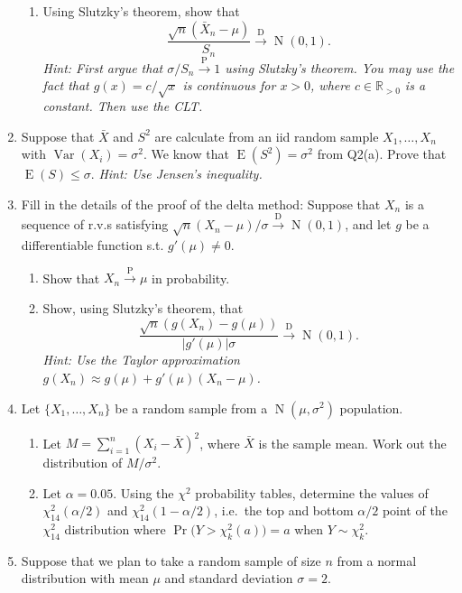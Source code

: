 \documentclass[
]{book}
\DeclareMathOperator{\E}{E}
\DeclareMathOperator{\Var}{Var}
\DeclareMathOperator{\N}{N}
\newcommand{\bbR}{\mathbb{R}}
\theoremstyle{definition}
\theoremstyle{definition}
\theoremstyle{definition}
\theoremstyle{definition}
\theoremstyle{remark}
\begin{document}
\begin{enumerate}
\begin{enumerate}
  \item
    Using Slutzky's theorem, show that
    \[
       \frac{\sqrt n(\bar X_n - \mu)}{S_n} \xrightarrow{\text{ D }} \N(0,1).
     \]
    \emph{Hint: First argue that \(\sigma/S_n \xrightarrow{\text{P}} 1\) using Slutzky's theorem. You may use the fact that \(g(x)=c/\sqrt{x}\) is continuous for \(x>0\), where \(c\in\bbR_{>0}\) is a constant. Then use the CLT.}
  \end{enumerate}
\item
  Suppose that \(\bar X\) and \(S^2\) are calculate from an iid random sample \(X_1,\dots,X_n\) with \(\Var(X_i)=\sigma^2\). We know that \(\E(S^2)=\sigma^2\) from Q2(a). Prove that \(\E(S)\leq \sigma\). \emph{Hint: Use Jensen's inequality.}
\item
  Fill in the details of the proof of the delta method: Suppose that \(X_n\) is a sequence of r.v.s satisfying \(\sqrt n (X_n-\mu)/\sigma \xrightarrow{\text{D}}\N(0,1)\), and let \(g\) be a differentiable function s.t. \(g'(\mu)\neq 0\).

  \begin{enumerate}
  \def\labelenumii{(\alph{enumii})}
  \item
    Show that \(X_n \xrightarrow{\text{P}} \mu\) in probability.
  \item
    Show, using Slutzky's theorem, that
    \[
       \frac{\sqrt n(g(X_n) - g(\mu))  }{|g'(\mu)|\sigma} \xrightarrow{\text{ D }} \N(0,1).
     \]
    \emph{Hint: Use the Taylor approximation \(g(X_n)\approx g(\mu)+g'(\mu)(X_n-\mu)\).}
  \end{enumerate}
\item
  Let \(\{X_1,\dots,X_n\}\) be a random sample from a \(\N(\mu,\sigma^2)\) population.

  \begin{enumerate}
  \def\labelenumii{(\alph{enumii})}
  \item
    Let \(M=\sum_{i=1}^n (X_i - \bar X)^2\), where \(\bar X\) is the sample mean. Work out the distribution of \(M/\sigma^2\).
  \item
    Let \(\alpha = 0.05\). Using the \(\chi^2\) probability tables, determine the values of \(\chi^2_{14}(\alpha/2)\) and \(\chi^2_{14}(1-\alpha/2)\), i.e.~the top and bottom \(\alpha/2\) point of the \(\chi^2_{14}\) distribution where \(\Pr\big(Y > \chi^2_{k}(a)\big) = a\) when \(Y\sim\chi^2_k\).
  \end{enumerate}
\item
  Suppose that we plan to take a random sample of size \(n\) from a normal distribution with mean \(\mu\) and standard deviation \(\sigma=2\).


\end{enumerate}
\end{document}
